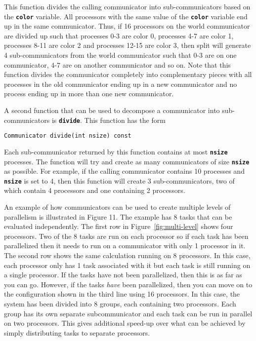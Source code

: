 This function divides the calling communicator into sub-communicators based on the \texttt{\textbf{color}} variable. All processors with the same value of the \texttt{\textbf{color}} variable end up in the same communicator. Thus, if 16 processors on the world communicator are divided up such that processes 0-3 are color 0, processes 4-7 are color 1, processes 8-11 are color 2 and processes 12-15 are color 3, then split will generate 4 sub-communicators from the world communicator such that 0-3 are on one communicator, 4-7 are on another communicator and so on. Note that this function divides the communicator completely into complementary pieces with all processes in the old communicator ending up in a new communicator and no process ending up in more than one new communicator.

A second function that can be used to decompose a communicator into sub-communicators is \texttt{\textbf{divide}}. This function has the form

{
\color{red}
\begin{Verbatim}[fontseries=b]
Communicator divide(int nsize) const
\end{Verbatim}
}

Each sub-communicator returned by this function contains at most \texttt{\textbf{nsize}} processes. The function will try and create as many communicators of size \texttt{\textbf{nsize}} as possible. For example, if the calling communicator contains 10 processes and \texttt{\textbf{nsize}} is set to 4, then this function will create 3 sub-communicators, two of which contain 4 processors and one containing 2 processors.

An example of how communicators can be used to create multiple levels of
parallelism is illustrated in Figure 11. The example has 8 tasks that can be
evaluated independently. The first row in Figure~\ref{fig:multi-level} shows four processors. Two of the 8 tasks are run on each processor so if each task has been parallelized then it needs to run on a communicator with only 1 processor in it. The second row shows the same calculation running on 8 processors. In this case, each processor only has 1 task associated with it but each task is still running on a single processor. If the tasks have not been parallelized, then this is as far as you can go. However, if the tasks \textit{have} been parallelized, then you can move on to the configuration shown in the third line using 16 processors. In this case, the system has been divided into 8 groups, each containing two processors. Each group has its own separate subcommunicator and each task can be run in parallel on two processors. This gives additional speed-up over what can be achieved by simply distributing tasks to separate processors.


